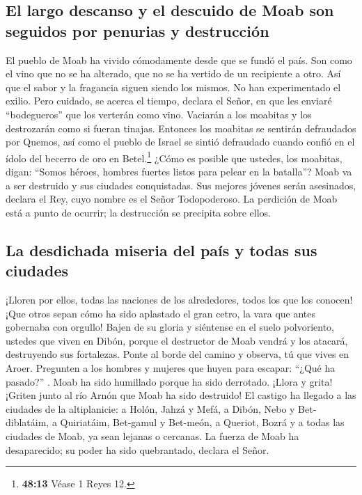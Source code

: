 \hypertarget{el-largo-descanso-y-el-descuido-de-moab-son-seguidos-por-penurias-y-destrucciuxf3n}{%
\subsection{El largo descanso y el descuido de Moab son seguidos por
penurias y
destrucción}\label{el-largo-descanso-y-el-descuido-de-moab-son-seguidos-por-penurias-y-destrucciuxf3n}}

 El pueblo de Moab ha vivido cómodamente desde que se
fundó el país. Son como el vino que no se ha alterado, que no se ha
vertido de un recipiente a otro. Así que el sabor y la fragancia siguen
siendo los mismos. No han experimentado el exilio.  Pero
cuidado, se acerca el tiempo, declara el Señor, en que les enviaré
``bodegueros'' que los verterán como vino. Vaciarán a los moabitas y los
destrozarán como si fueran tinajas.  Entonces los
moabitas se sentirán defraudados por Quemos, así como el pueblo de
Israel se sintió defraudado cuando confió en el ídolo del becerro de oro
en Betel.\footnote{\textbf{48:13} Véase 1 Reyes 12.} 
¿Cómo es posible que ustedes, los moabitas, digan: ``Somos héroes,
hombres fuertes listos para pelear en la batalla''?  Moab
va a ser destruido y sus ciudades conquistadas. Sus mejores jóvenes
serán asesinados, declara el Rey, cuyo nombre es el Señor Todopoderoso.
 La perdición de Moab está a punto de ocurrir; la
destrucción se precipita sobre ellos.

\hypertarget{la-desdichada-miseria-del-pauxeds-y-todas-sus-ciudades}{%
\subsection{La desdichada miseria del país y todas sus
ciudades}\label{la-desdichada-miseria-del-pauxeds-y-todas-sus-ciudades}}

 ¡Lloren por ellos, todas las naciones de los
alrededores, todos los que los conocen! ¡Que otros sepan cómo ha sido
aplastado el gran cetro, la vara que antes gobernaba con orgullo!
 Bajen de su gloria y siéntense en el suelo polvoriento,
ustedes que viven en Dibón, porque el destructor de Moab vendrá y los
atacará, destruyendo sus fortalezas.  Ponte al borde del
camino y observa, tú que vives en Aroer. Pregunten a los hombres y
mujeres que huyen para escapar: ``¿Qué ha pasado?'' . 
Moab ha sido humillado porque ha sido derrotado. ¡Llora y grita! ¡Griten
junto al río Arnón que Moab ha sido destruido!  El
castigo ha llegado a las ciudades de la altiplanicie: a Holón, Jahzá y
Mefá,  a Dibón, Nebo y Bet-diblatáim,  a
Quiriatáim, Bet-gamul y Bet-meón,  a Queriot, Bozrá y a
todas las ciudades de Moab, ya sean lejanas o cercanas. 
La fuerza de Moab ha desaparecido; su poder ha sido quebrantado, declara
el Señor.

